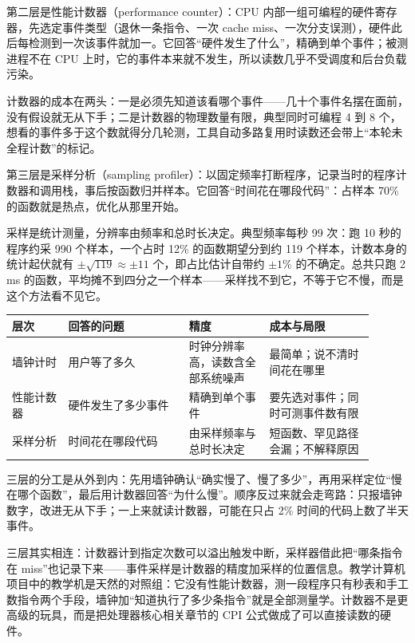第二层是性能计数器（performance counter）：CPU 内部一组可编程的硬件寄存器，先选定事件类型（退休一条指令、一次 cache miss、一次分支误测），硬件此后每检测到一次该事件就加一。它回答“硬件发生了什么”，精确到单个事件；被测进程不在 CPU 上时，它的事件本来就不发生，所以读数几乎不受调度和后台负载污染。

计数器的成本在两头：一是必须先知道该看哪个事件——几十个事件名摆在面前，没有假设就无从下手；二是计数器的物理数量有限，典型同时可编程 4 到 8 个，想看的事件多于这个数就得分几轮测，工具自动多路复用时读数还会带上“本轮未全程计数”的标记。

第三层是采样分析（sampling profiler）：以固定频率打断程序，记录当时的程序计数器和调用栈，事后按函数归并样本。它回答“时间花在哪段代码”：占样本 70\% 的函数就是热点，优化从那里开始。

采样是统计测量，分辨率由频率和总时长决定。典型频率每秒 99 次：跑 10 秒的程序约采 990 个样本，一个占时 12\% 的函数期望分到约 119 个样本，计数本身的统计起伏就有 $\pm\sqrt{119}\approx\pm11$ 个，即占比估计自带约 $\pm1\%$ 的不确定。总共只跑 2 ms 的函数，平均摊不到四分之一个样本——采样找不到它，不等于它不慢，而是这个方法看不见它。

\begin{longtable}{L{0.14\linewidth}L{0.30\linewidth}L{0.20\linewidth}L{0.26\linewidth}}
\toprule
层次 & 回答的问题 & 精度 & 成本与局限 \\
\midrule
墙钟计时 & 用户等了多久 & 时钟分辨率高，读数含全部系统噪声 & 最简单；说不清时间花在哪里 \\\tablerowrule
性能计数器 & 硬件发生了多少事件 & 精确到单个事件 & 要先选对事件；同时可测事件数有限 \\\tablerowrule
采样分析 & 时间花在哪段代码 & 由采样频率与总时长决定 & 短函数、罕见路径会漏；不解释原因 \\
\bottomrule
\end{longtable}

三层的分工是从外到内：先用墙钟确认“确实慢了、慢了多少”，再用采样定位“慢在哪个函数”，最后用计数器回答“为什么慢”。顺序反过来就会走弯路：只报墙钟数字，改进无从下手；一上来就读计数器，可能在只占 2\% 时间的代码上数了半天事件。

三层其实相连：计数器计到指定次数可以溢出触发中断，采样器借此把“哪条指令在 miss”也记录下来——事件采样是计数器的精度加采样的位置信息。教学计算机项目中的教学机是天然的对照组：它没有性能计数器，测一段程序只有秒表和手工数指令两个手段，墙钟加“知道执行了多少条指令”就是全部测量学。计数器不是更高级的玩具，而是把处理器核心相关章节的 CPI 公式做成了可以直接读数的硬件。

